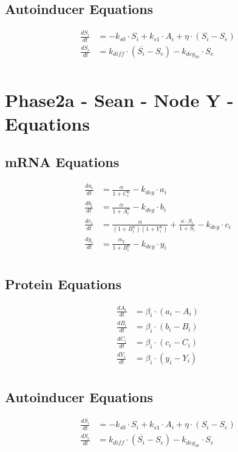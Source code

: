 \documentclass[fleqn]{article}
\begin{document}
\subsection*{Autoinducer Equations}
\begin{align*}
\frac{dS_i}{dt} &= -k_{s0} \cdot S_i + k_{s1} \cdot A_i + \eta \cdot (S_i - S_e) \\
\frac{dS_e}{dt} &= k_{diff} \cdot (\overline{S_i} - S_e) - k_{deg_{Se}} \cdot S_e \\
\end{align*}

\pagebreak

\section*{Phase2a - Sean - Node Y - Equations}

\subsection*{mRNA Equations}
\begin{align*}
\frac{da_i}{dt} &= \frac{\alpha}{1 + C_i^n} - k_{deg} \cdot a_i \\
\frac{db_i}{dt} &= \frac{\alpha}{1 + A_i^n} - k_{deg} \cdot b_i \\
\frac{dc_i}{dt} &= \frac{\alpha}{(1 + B_i^n)(1 + Y_i^n)} + \frac{\kappa \cdot S_i}{1 + S_i} - k_{deg} \cdot c_i \\
\frac{dy_i}{dt} &= \frac{\alpha_y}{1 + B_i^n} - k_{deg} \cdot y_i \\
\end{align*}

\subsection*{Protein Equations}
\begin{align*}
\frac{dA_i}{dt} &= \beta_i \cdot (a_i - A_i) \\
\frac{dB_i}{dt} &= \beta_i \cdot (b_i - B_i) \\
\frac{dC_i}{dt} &= \beta_i \cdot (c_i - C_i) \\
\frac{dY_i}{dt} &= \beta_i \cdot (y_i - Y_i) \\
\end{align*}

\subsection*{Autoinducer Equations}
\begin{align*}
\frac{dS_i}{dt} &= -k_{s0} \cdot S_i + k_{s1} \cdot A_i + \eta \cdot (S_i - S_e) \\
\frac{dS_e}{dt} &= k_{diff} \cdot (\overline{S_i} - S_e) - k_{deg_{Se}} \cdot S_e \\
\end{align*}
\end{document}
